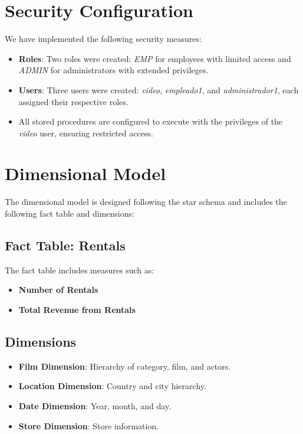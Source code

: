 \documentclass[a4paper, 12pt]{article}
\begin{document}
\section{Security Configuration}
We have implemented the following security measures:
\begin{itemize}
    \item \textbf{Roles}: Two roles were created: \emph{EMP} for employees with limited access and \emph{ADMIN} for administrators with extended privileges.
    \item \textbf{Users}: Three users were created: \emph{video}, \emph{empleado1}, and \emph{administrador1}, each assigned their respective roles.
    \item All stored procedures are configured to execute with the privileges of the \emph{video} user, ensuring restricted access.
\end{itemize}

\section{Dimensional Model}
The dimensional model is designed following the star schema and includes the following fact table and dimensions:

\subsection{Fact Table: Rentals}
The fact table includes measures such as:
\begin{itemize}
    \item \textbf{Number of Rentals}
    \item \textbf{Total Revenue from Rentals}
\end{itemize}

\subsection{Dimensions}
\begin{itemize}
    \item \textbf{Film Dimension}: Hierarchy of category, film, and actors.
    \item \textbf{Location Dimension}: Country and city hierarchy.
    \item \textbf{Date Dimension}: Year, month, and day.
    \item \textbf{Store Dimension}: Store information.
\end{itemize}
\end{document}

